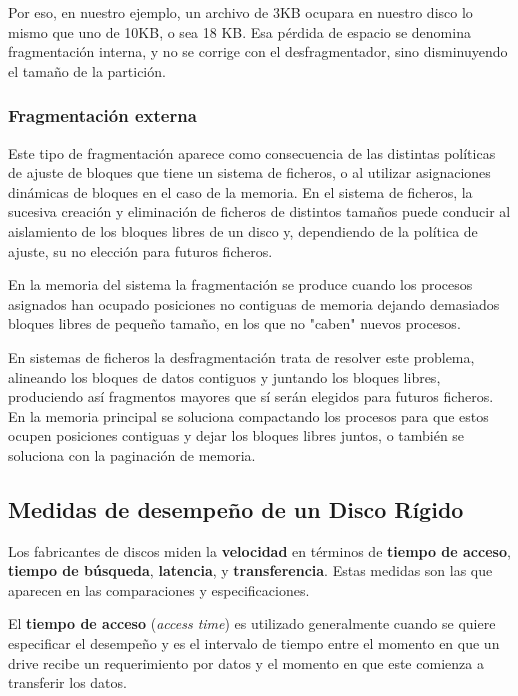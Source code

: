 \documentclass[10pt,a4paper]{article}
\begin{document}
Por eso, en nuestro ejemplo, un archivo de 3KB ocupara en nuestro disco lo mismo que uno de 10KB, o sea 18 KB. Esa pérdida de espacio se denomina fragmentación interna, y no se corrige con el desfragmentador, sino disminuyendo el tamaño de la partición.


\subsubsection{Fragmentación externa}
Este tipo de fragmentación aparece como consecuencia de las distintas políticas de ajuste de bloques que tiene un sistema de ficheros, o al utilizar asignaciones dinámicas de bloques en el caso de la memoria. En el sistema de ficheros, la sucesiva creación y eliminación de ficheros de distintos tamaños puede conducir al aislamiento de los bloques libres de un disco y, dependiendo de la política de ajuste, su no elección para futuros ficheros.

En la memoria del sistema la fragmentación se produce cuando los procesos asignados han ocupado posiciones no contiguas de memoria dejando demasiados bloques libres de pequeño tamaño, en los que no "caben" nuevos procesos.

En sistemas de ficheros la desfragmentación trata de resolver este problema, alineando los bloques de datos contiguos y juntando los bloques libres, produciendo así fragmentos mayores que sí serán elegidos para futuros ficheros. En la memoria principal se soluciona compactando los procesos para que estos ocupen posiciones contiguas y dejar los bloques libres juntos, o también se soluciona con la paginación de memoria.

\subsection{Medidas de desempeño de un Disco Rígido}

Los fabricantes de discos miden la \textbf{velocidad} en términos de \textbf{tiempo de acceso}, \textbf{tiempo de búsqueda}, \textbf{latencia}, y \textbf{transferencia}. Estas medidas son las que aparecen en las comparaciones y especificaciones.

El \textbf{tiempo de acceso} (\textit{access time}) es utilizado generalmente cuando se quiere especificar el desempeño y es el intervalo de tiempo entre el momento en que un drive recibe un requerimiento por datos y el momento en que este comienza a transferir los datos.
\end{document}
